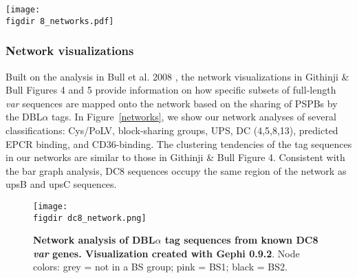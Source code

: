 \documentclass[10pt,twocolumn,superscriptaddress]{revtex4-1}
\newcommand{\var}{{\it var}\xspace}
\newcommand{\dbla}{{DBL$\alpha$}\xspace}
\newcommand{\cidra}{{CIDR$\alpha$}\xspace}
\newcommand{\cp}{{Cys/PoLV}\xspace}
\newcommand{\paper}{{Githinji \& Bull}\xspace}
\newcommand{\figdir}{figures/}
\begin{document}
\begin{figure*}[t]
	\centering
	\texttt{[image: \\figdir 8\_networks.pdf]}
	\caption{{\bf Various \dbla tag classifications mapped onto the block-sharing network}. (A) \cp analysis for all sequences; (B) BS analysis for all sequences; (C) ups grouping; (D) \cp analysis for full length \var gene sequences from 6 laboratory isolates; (E) BS analysis for full length \var gene sequences from 6 laboratory isolates; (F) domain cassette (DC) classification for DC4, DC5, DC8 and DC13; (G) predicted EPCR-binding phenotype due to \cidra1.1, \cidra1.4, \cidra1.5, \cidra1.6, \cidra1.7 or \cidra1.8 (Lau et al., 2015) for sequences with \cidra information available; (H) predicted CD36-binding phenotype due to \cidra2, \cidra3, \cidra4, \cidra5 (Robinson et al., 2003) for sequences with \cidra information available. Node colors: For all, unclassified = 0. (A\&D) red = CP1, purple = CP2, pink = CP3, green = CP4, yellow = CP5, brown = CP6. (B\& E) blue = BS1, green = BS2; (C) upsA = orange, green = upsB, blue = upsC; F) pink = DC8, purple = DC5, green = DC13, orange = DC4; G) orange = predicted EPCR binding; H) purple = predicted CD36 binding.}
	\label{networks}
\end{figure*}


\subsubsection{Network visualizations}
Built on the analysis in Bull et al. 2008 \cite{bull2008}, the network visualizations in \paper Figures 4 and 5 provide information on how specific subsets of full-length \var sequences are mapped onto the network based on the sharing of PSPBs by the \dbla tags. In Figure~\ref{networks}, we show our network analyses of several classifications: \cp, block-sharing groups, UPS, DC (4,5,8,13), predicted EPCR binding, and CD36-binding. The clustering tendencies of the tag sequences in our networks are similar to those in \paper Figure 4. Consistent with the bar graph analysis, DC8 sequences occupy the same region of the network as upsB and upsC sequences.  

\begin{figure}[t]
	\centering
	\texttt{[image: \\figdir dc8\_network.png]}
	\caption{{\bf Network analysis of \dbla tag sequences from known DC8 \var genes. Visualization created with Gephi 0.9.2}. Node colors: grey = not in a BS group; pink = BS1; black = BS2.}
	\label{dc8}
\end{figure}
\end{document}
